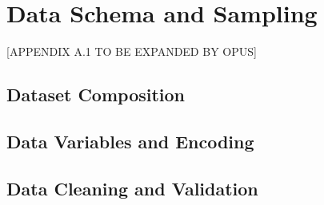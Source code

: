 \section{Data Schema and Sampling}
\label{sec:A1}

[APPENDIX A.1 TO BE EXPANDED BY OPUS]

\subsection{Dataset Composition}

\subsection{Data Variables and Encoding}

\subsection{Data Cleaning and Validation}
